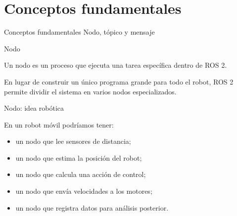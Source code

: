 \documentclass[aspectratio=169]{beamer}
\begin{document}
\section{Conceptos fundamentales}

\SectionSlide
{Conceptos fundamentales}
{Nodo, tópico y mensaje}

\begin{frame}{Nodo}

    Un nodo es un proceso que ejecuta una tarea específica dentro de ROS 2.

    En lugar de construir un único programa grande para todo el robot, ROS 2
    permite dividir el sistema en varios nodos especializados.

    \vspace{0.3cm}


\end{frame}

\begin{frame}{Nodo: idea robótica}

    En un robot móvil podríamos tener:

    \begin{itemize}
        \item un nodo que lee sensores de distancia;
        \item un nodo que estima la posición del robot;
        \item un nodo que calcula una acción de control;
        \item un nodo que envía velocidades a los motores;
        \item un nodo que registra datos para análisis posterior.
    \end{itemize}

    \vspace{0.3cm}


\end{frame}
\end{document}
